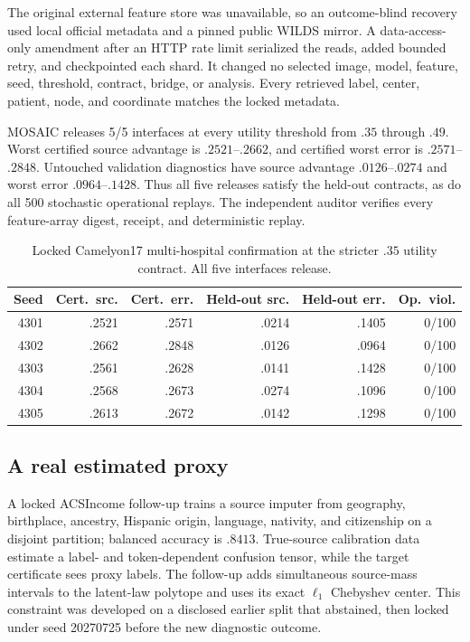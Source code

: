 The original external feature store was unavailable, so an outcome-blind
recovery used local official metadata and a pinned public WILDS mirror. A
data-access-only amendment after an HTTP rate limit serialized the reads,
added bounded retry, and checkpointed each shard. It changed no selected image,
model, feature, seed, threshold, contract, bridge, or analysis. Every retrieved
label, center, patient, node, and coordinate matches the locked metadata.

MOSAIC releases 5/5 interfaces at every utility threshold from $.35$ through
$.49$. Worst certified source advantage is $.2521$--$.2662$, and certified
worst error is $.2571$--$.2848$. Untouched validation diagnostics have source
advantage $.0126$--$.0274$ and worst error $.0964$--$.1428$. Thus all five
releases satisfy the held-out contracts, as do all 500 stochastic operational
replays. The independent auditor verifies every feature-array digest, receipt,
and deterministic replay.

\begin{table}[t]
\centering
\scriptsize
\setlength{\tabcolsep}{3.5pt}
\begin{tabular}{rrrrrr}
\hline
Seed & Cert.\ src. & Cert.\ err. & Held-out src. & Held-out err. & Op.\ viol.\\
\hline
4301 & .2521 & .2571 & .0214 & .1405 & 0/100\\
4302 & .2662 & .2848 & .0126 & .0964 & 0/100\\
4303 & .2561 & .2628 & .0141 & .1428 & 0/100\\
4304 & .2568 & .2673 & .0274 & .1096 & 0/100\\
4305 & .2613 & .2672 & .0142 & .1298 & 0/100\\
\hline
\end{tabular}
\caption{Locked Camelyon17 multi-hospital confirmation at the stricter $.35$
utility contract. All five interfaces release.}
\label{supp:tab:camelyon-streamed}
\end{table}

\subsection{A real estimated proxy}

A locked ACSIncome follow-up trains a source imputer from geography,
birthplace, ancestry, Hispanic origin, language, nativity, and citizenship on
a disjoint partition; balanced accuracy is $.8413$. True-source calibration
data estimate a label- and token-dependent confusion tensor, while the target
certificate sees proxy labels. The follow-up adds simultaneous source-mass
intervals to the latent-law polytope and uses its exact $\ell_1$ Chebyshev
center. This constraint was developed on a disclosed earlier split that
abstained, then locked under seed 20270725 before the new diagnostic outcome.

